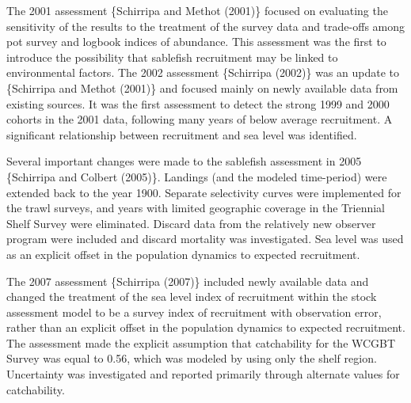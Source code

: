 \documentclass[11pt,
  english,
  a4paper,
]{article}
\begin{document}
\leavevmode\tagmcend\tagstructend\par


The 2001 assessment \{{Schirripa and Methot (2001)\leavevmode\tagmcend\tagstructend}\} focused on evaluating the sensitivity of the results to the treatment of the survey data and trade-offs among pot survey and logbook indices of abundance. This assessment was the first to introduce the possibility that sablefish recruitment may be linked to environmental factors. The 2002 assessment \{{Schirripa (2002)\leavevmode\tagmcend\tagstructend}\} was an update to \{{Schirripa and Methot (2001)\leavevmode\tagmcend\tagstructend}\} and focused mainly on newly available data from existing sources. It was the first assessment to detect the strong 1999 and 2000 cohorts in the 2001 data, following many years of below average recruitment. A significant relationship between recruitment and sea level was identified.

\leavevmode\tagmcend\tagstructend\par


Several important changes were made to the sablefish assessment in 2005 \{{Schirripa and Colbert (2005)\leavevmode\tagmcend\tagstructend}\}. Landings (and the modeled time-period) were extended back to the year 1900. Separate selectivity curves were implemented for the trawl surveys, and years with limited geographic coverage in the Triennial Shelf Survey were eliminated. Discard data from the relatively new observer program were included and discard mortality was investigated. Sea level was used as an explicit offset in the population dynamics to expected recruitment.

\leavevmode\tagmcend\tagstructend\par


The 2007 assessment \{{Schirripa (2007)\leavevmode\tagmcend\tagstructend}\} included newly available data and changed the treatment of the sea level index of recruitment within the stock assessment model to be a survey index of recruitment with observation error, rather than an explicit offset in the population dynamics to expected recruitment. The assessment made the explicit assumption that catchability for the WCGBT Survey was equal to 0.56, which was modeled by using only the shelf region. Uncertainty was investigated and reported primarily through alternate values for catchability.
\end{document}
